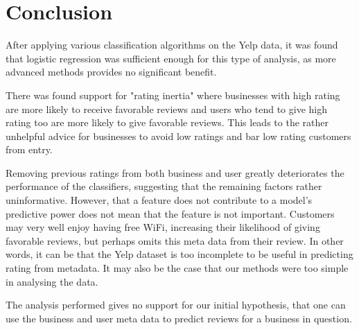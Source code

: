 \begin{minipage}{\columnwidth}
\section{Conclusion}\label{sec:Conclusion}
After applying various classification algorithms on the Yelp data, it was found that logistic regression was sufficient enough for this type of analysis, as more advanced methods provides no significant benefit.

There was found support for "rating inertia" where businesses with high rating are more
likely to receive favorable reviews and users who tend to give high rating too are more likely to give favorable reviews. This leads to the rather unhelpful advice for businesses to avoid low ratings and bar low rating customers from entry.

Removing previous ratings from both business and user greatly deteriorates the
performance of the classifiers, suggesting that the remaining factors rather uninformative. However, that a feature does not contribute to a model's predictive power
does not mean that the feature is not important. Customers may very well enjoy having
free WiFi, increasing their likelihood of giving favorable reviews, but perhaps omits this meta data from their review. In other words, it can be that the Yelp dataset is
too incomplete to be useful in predicting rating from metadata. It may also
be the case that our methods were too simple in analysing the data.

The analysis performed gives no support for our initial hypothesis, that one can use the
business and user meta data to predict reviews for a business in question. 
\end{minipage}